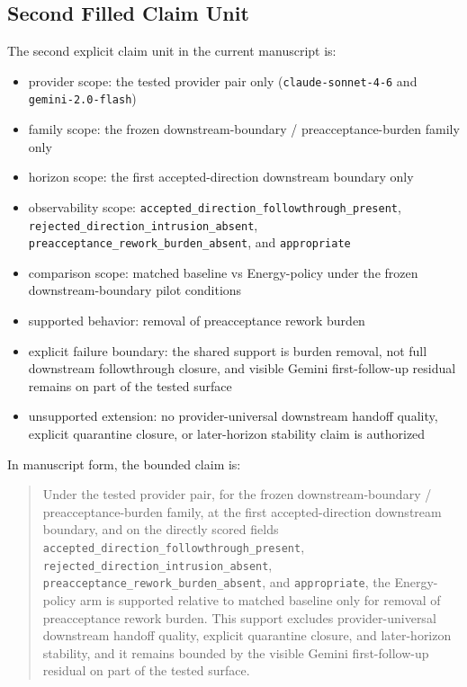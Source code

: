 \documentclass[11pt]{article}
\begin{document}
\subsection{Second Filled Claim Unit}

The second explicit claim unit in the current manuscript is:

\begin{itemize}
\item provider scope:
  the tested provider pair only (\texttt{claude-sonnet-4-6} and
  \texttt{gemini-2.0-flash})
\item family scope:
  the frozen downstream-boundary / preacceptance-burden family only
\item horizon scope:
  the first accepted-direction downstream boundary only
\item observability scope:
  \texttt{accepted\_direction\_followthrough\_present},
  \texttt{rejected\_direction\_intrusion\_absent},
  \texttt{preacceptance\_rework\_burden\_absent}, and \texttt{appropriate}
\item comparison scope:
  matched baseline vs Energy-policy under the frozen downstream-boundary pilot
  conditions
\item supported behavior:
  removal of preacceptance rework burden
\item explicit failure boundary:
  the shared support is burden removal, not full downstream followthrough
  closure, and visible Gemini first-follow-up residual remains on part of the
  tested surface
\item unsupported extension:
  no provider-universal downstream handoff quality, explicit quarantine
  closure, or later-horizon stability claim is authorized
\end{itemize}

In manuscript form, the bounded claim is:

\begin{quote}
Under the tested provider pair, for the frozen downstream-boundary /
preacceptance-burden family, at the first accepted-direction downstream
boundary, and on the directly scored fields
\texttt{accepted\_direction\_followthrough\_present},
\texttt{rejected\_direction\_intrusion\_absent},
\texttt{preacceptance\_rework\_burden\_absent}, and \texttt{appropriate}, the
Energy-policy arm is supported relative to matched baseline only for removal of
preacceptance rework burden. This support excludes provider-universal
downstream handoff quality, explicit quarantine closure, and later-horizon
stability, and it remains bounded by the visible Gemini first-follow-up
residual on part of the tested surface.
\end{quote}
\end{document}
